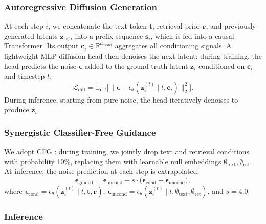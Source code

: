 \documentclass{article}
\begin{document}
\subsubsection{Autoregressive Diffusion Generation}

At each step \(i\), we concatenate the text token \(\mathbf{t}\), retrieval prior \(\mathbf{r}\),
and previously generated latents \(\mathbf{z}_{<i}\) into a prefix sequence \(\mathbf{s}_i\), which
is fed into a causal Transformer. Its output \(\mathbf{c}_i \in \mathbb{R}^{d_{\text{model}}}\)
aggregates all conditioning signals. A lightweight MLP diffusion head then denoises the next
latent: during training, the head predicts the noise \(\boldsymbol{\epsilon}\) added to the
ground-truth latent \(\mathbf{z}_i\) conditioned on \(\mathbf{c}_i\) and timestep \(t\):
\begin{equation}
\mathcal{L}_{\text{diff}} = \mathbb{E}_{\boldsymbol{\epsilon}, t}
\big[\|\boldsymbol{\epsilon} - \epsilon_{\theta}(\mathbf{z}_i^{(t)} \mid t, \mathbf{c}_i)\|_2^2\big].
\label{eq:diff-loss}
\end{equation}
During inference, starting from pure noise, the head iteratively denoises to produce
\(\hat{\mathbf{z}}_i\).

\subsubsection{Synergistic Classifier-Free Guidance}

We adopt CFG \citep{ho2022classifier,chang2023muse}: during training, we jointly drop text and retrieval conditions
with probability 10\%, replacing them with learnable null embeddings \(\emptyset_{\text{text}}, \emptyset_{\text{ret}}\).
At inference, the noise prediction at each step is extrapolated:
\begin{equation}
\boldsymbol{\epsilon}_{\text{guided}} = \boldsymbol{\epsilon}_{\text{uncond}}
+ s \cdot \big(\boldsymbol{\epsilon}_{\text{cond}} - \boldsymbol{\epsilon}_{\text{uncond}}\big),
\label{eq:cfg}
\end{equation}
where \(\boldsymbol{\epsilon}_{\text{cond}} = \epsilon_{\theta}(\mathbf{z}_i^{(t)} \mid t, \mathbf{t},
\mathbf{r})\), \(\boldsymbol{\epsilon}_{\text{uncond}} = \epsilon_{\theta}(\mathbf{z}_i^{(t)} \mid t,
\emptyset_{\text{text}}, \emptyset_{\text{ret}})\), and \(s = 4.0\).

\subsubsection{Inference}
\end{document}
